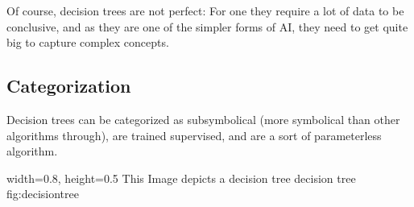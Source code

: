 Of course, decision trees are not perfect: For one they require a lot of data to be conclusive, and as they are one of the simpler forms of AI, they need to get quite big to capture complex concepts.

\subsection{Categorization}
Decision trees can be categorized as subsymbolical (more symbolical than other algorithms through), are trained supervised, and are a sort of parameterless algorithm.

    {width=0.8\textwidth, height=0.5\textheight} %
    {This Image depicts a decision tree}   %
    {decision tree}   %
    {fig:decisiontree}    %

 